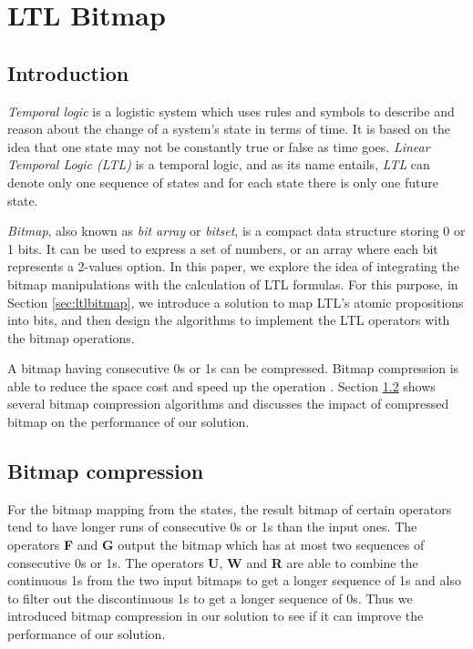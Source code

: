 \chapter{LTL Bitmap}

\section{Introduction}\label{sec:intro} %

\emph{Temporal logic} \cite{huth2004} is a logistic system which uses rules and symbols to describe and reason about the change of a system's state in terms of time. It is based on the idea that one state may not be constantly true or false as time goes. \emph{Linear Temporal Logic (LTL)} \cite{pnueli97} is a temporal logic, and as its name entails, \emph{LTL} can denote only one sequence of states and for each state there is only one future state.

\emph{Bitmap}, also known as \emph{bit array} or \emph{bitset}, is a compact data structure storing 0 or 1 bits. It can be used to express a set of numbers, or an array where each bit represents a 2-values option. In this paper, we explore the idea of integrating the bitmap manipulations with the calculation of LTL formulas. For this purpose, in Section \ref{sec:ltlbitmap}, we introduce a solution to map LTL's atomic propositions into bits, and then design the algorithms to implement the LTL operators with the bitmap operations.

A bitmap having consecutive 0s or 1s can be compressed. Bitmap compression is able to reduce the space cost and speed up the operation \cite{lemire2014}. Section \ref{sec:compression} shows several bitmap compression algorithms and discusses the impact of compressed bitmap on the performance of our solution. 


\section{Bitmap compression}\label{sec:compression} %

For the bitmap mapping from the states, the result bitmap of certain operators tend to have longer runs of consecutive 0s or 1s than the input ones. The operators \textbf{F} and \textbf{G} output the bitmap which has at most two sequences of consecutive 0s or 1s. The operators \textbf{U}, \textbf{W} and \textbf{R} are able to combine the continuous 1s from the two input bitmaps to get a longer sequence of 1s and also to filter out the discontinuous 1s to get a longer sequence of 0s. Thus we introduced bitmap compression in our solution to see if it can improve the performance of our solution.

